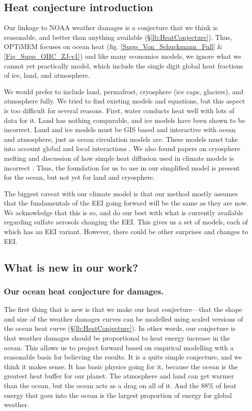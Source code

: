\documentclass{article}
\begin{document}
\subsection{Heat conjecture introduction} Our linkage to NOAA weather damages is a conjecture that we think is reasonable, and better than anything available (\S\ref{lb:HeatConjecture}). Thus, OPTiMEM focuses on ocean heat (fig. \ref{Supp_Von_Schuckmann_Full} \& \ref{Fig_Supp_OHC_ZJ-v1}) and like many economics models, we ignore what we cannot yet practically model, which include the single digit global heat fractions of ice, land, and atmosphere. 

We would prefer to include land, permafrost, cryosphere (ice caps, glaciers), and atmosphere fully. We tried to find existing models and equations, but this aspect is too difficult for several reasons. First, water conducts heat well with lots of data for it. Land has nothing comparable, and ice models have been shown to be incorrect. Land and ice models must be GIS based and interactive with ocean and atmosphere, just as ocean circulation models are. These models must take into account global and local interactions \cite{Valdivia2023WarmingRossGyre}. We also found papers on cryosphere melting and discussion of how simple heat diffusion used in climate models is incorrect \cite{Batchelor2023RapidIcdRetreatHundredsMetres, Milillo2022RapidGlacierRetreat, Pettit2021ThwaitesEasternCollapse}. Thus, the foundation for us to use in our simplified model is present for the ocean, but not yet for land and cryosphere. 

The biggest caveat with our climate model is that our method mostly assumes that the fundamentals of the EEI going forward will be the same as they are now. We acknowledge that this is so, and do our best with what is currently available regarding sulfate aerosols changing the EEI. This gives us a set of models, each of which has an EEI variant. However, there could be other surprises and changes to EEI.

\subsection{What is new in our work?} 

\subsubsection{Our ocean heat conjecture for damages.} The first thing that is new is that we make our heat conjecture---that the shape and size of the weather damages curves can be modelled using scaled versions of the ocean heat curve (\S\ref{lb:HeatConjecture}). In other words, our conjecture is that weather damages should be proportional to heat energy increase in the ocean. This allows us to project forward based on empirical modelling with a reasonable basis for believing the results. It is a quite simple conjecture, and we think it makes sense. It has basic physics going for it, because the ocean is the greatest heat buffer for our planet. The atmosphere and land can get warmer than  the ocean, but the ocean acts as a drag on all of it. And the 88\% of heat energy that goes into the ocean is the largest proportion of energy for global weather. 
\end{document}
